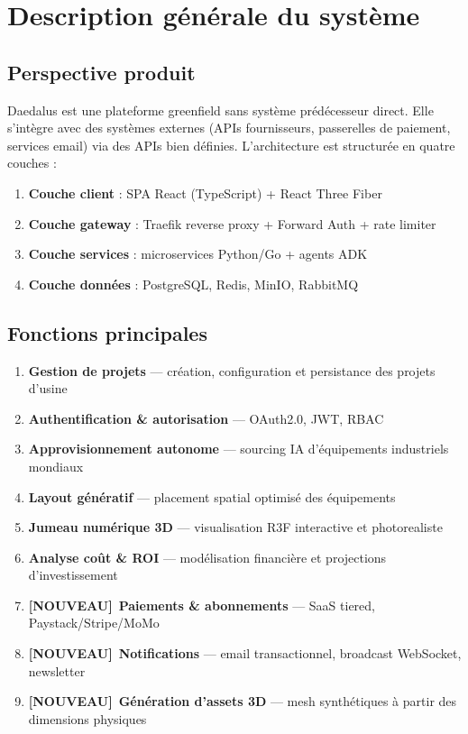 \documentclass[12pt,a4paper]{article}
\newcommand{\NEW}{\textcolor{daedalusgold}{\textbf{[NOUVEAU]}}}
\begin{document}
\section{Description générale du système}

\subsection{Perspective produit}
Daedalus est une plateforme greenfield sans système prédécesseur direct. Elle s'intègre avec des systèmes externes (APIs fournisseurs, passerelles de paiement, services email) via des APIs bien définies. L'architecture est structurée en quatre couches :

\begin{enumerate}
  \item \textbf{Couche client} : SPA React (TypeScript) + React Three Fiber
  \item \textbf{Couche gateway} : Traefik reverse proxy + Forward Auth + rate limiter
  \item \textbf{Couche services} : microservices Python/Go + agents ADK
  \item \textbf{Couche données} : PostgreSQL, Redis, MinIO, RabbitMQ
\end{enumerate}

\subsection{Fonctions principales}

\begin{enumerate}
  \item \textbf{Gestion de projets} — création, configuration et persistance des projets d'usine
  \item \textbf{Authentification \& autorisation} — OAuth2.0, JWT, RBAC
  \item \textbf{Approvisionnement autonome} — sourcing IA d'équipements industriels mondiaux
  \item \textbf{Layout génératif} — placement spatial optimisé des équipements
  \item \textbf{Jumeau numérique 3D} — visualisation R3F interactive et photorealiste
  \item \textbf{Analyse coût \& ROI} — modélisation financière et projections d'investissement
  \item \NEW\ \textbf{Paiements \& abonnements} — SaaS tiered, Paystack/Stripe/MoMo
  \item \NEW\ \textbf{Notifications} — email transactionnel, broadcast WebSocket, newsletter
  \item \NEW\ \textbf{Génération d'assets 3D} — mesh synthétiques à partir des dimensions physiques
\end{enumerate}
\end{document}
